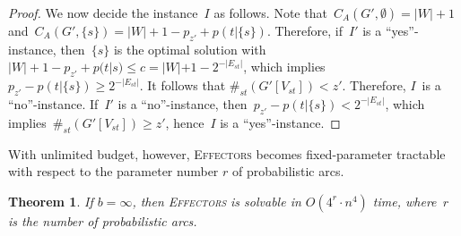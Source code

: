 \documentclass{article}
\newtheorem{theorem}{Theorem}
\newcommand{\probEffectors}{\textsc{Effectors}\xspace}
\begin{document}
\begin{proof}
  We now decide the instance~$I$ as follows.
  Note that~$C_A(G',\emptyset)=|W|+1$
  and~$C_A(G',\{s\})=|W|+1-p_{z'}+p(t|\{s\})$.
  Therefore, if~$I'$ is a ``yes''-instance, then~$\{s\}$ is the
  optimal solution with $|W|+1-p_{z'}+p(t|s) \leq c =
  |W|+1-2^{-|E_{st}|}$, which implies~$p_{z'} - p(t|\{s\}) \geq 2^{-|E_{st}|}$.
  It follows that $\#_{st}(G'[V_{st}]) < z'$.
  Therefore, $I$~is a ``no''-instance.
  If~$I'$ is a ``no''-instance, then~$p_{z'} - p(t|\{s\}) <
  2^{-|E_{st}|}$, which implies~$\#_{st}(G'[V_{st}]) \geq z'$,
  hence~$I$ is a ``yes''-instance.     
\end{proof}

With unlimited budget, however, \probEffectors becomes fixed-parameter
tract\-able with respect to the parameter number $r$ of probabilistic arcs.

\begin{theorem}\label{thm:inftyFPTr}
  If $b = \infty$, 
  then \probEffectors is solvable in $O(4^r\cdot n^4)$ time,
  where~$r$ is the number of probabilistic arcs.
\end{theorem}

\newcommand{\Xplus}{X_{o}}
\newcommand{\Xp}{X_p}
\newcommand{\Yplus}{Y_{o}}
\newcommand{\Yp}{Y_p}
\newcommand{\Vplus}{V_{o}}
\newcommand{\Vp}{V_p}
\end{document}
